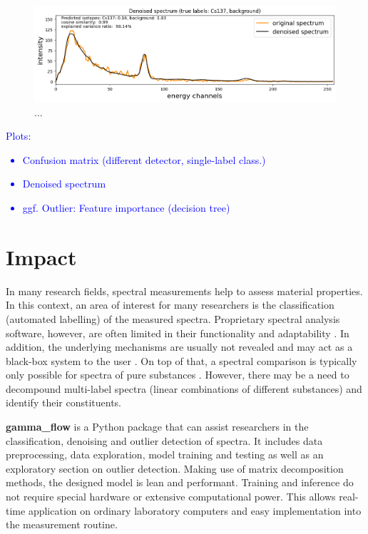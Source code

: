 \documentclass[preprint,12pt, a4paper]{elsarticle}
\begin{document}
\begin{figure}
\includegraphics[width=\textwidth]{Denoised_Cs137.png}
\caption{...}
\label{fig:denoised_spectrum}
\end{figure}

\textcolor{blue}{
Plots: 
\begin{itemize}
	\item Confusion matrix (different detector, single-label class.)
	\item Denoised spectrum
	\item ggf. Outlier: Feature importance (decision tree)
\end{itemize}}


\section{Impact}
In many research fields, spectral measurements help to assess material properties. 
In this context, an area of interest for many researchers is the classification (automated labelling) of the measured spectra. Proprietary spectral analysis software, however, are often limited in their functionality and adaptability \cite{Lam2011, Nasereddin2023}. In addition, the underlying mechanisms are usually not revealed and may act as a black-box system to the user \cite{ElAmri2022}. On top of that, a spectral comparison is typically only possible for spectra of pure substances \cite{Cowger2021}. However, there may be a need to decompound multi-label spectra (linear combinations of different substances) and identify their constituents. 

\textbf{gamma\_flow} is a Python package that can assist researchers in the classification, denoising and outlier detection of spectra. It includes data preprocessing, data exploration, model training and testing as well as an exploratory section on outlier detection. Making use of matrix decomposition methods, the designed model is lean and performant. Training and inference do not require special hardware or extensive computational power. This allows real-time application on ordinary laboratory computers and easy implementation into the measurement routine. 
\end{document}
